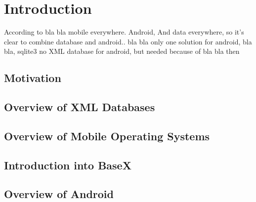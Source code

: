 \chapter{Introduction}
According to bla bla mobile everywhere. Android, And data everywhere, so it's clear to combine database and android.. bla bla
only one solution for android, bla bla, sqlite3
no XML database for android, but needed because of bla bla
then 
\section{Motivation}
\label{sec:motivation}

\section{Overview of XML Databases}

\section{Overview of Mobile Operating Systems}

\section{Introduction into  BaseX}
\label{sec:overview-of-basex}

\section{Overview of Android}
\label{sec:overview-of-basex}



